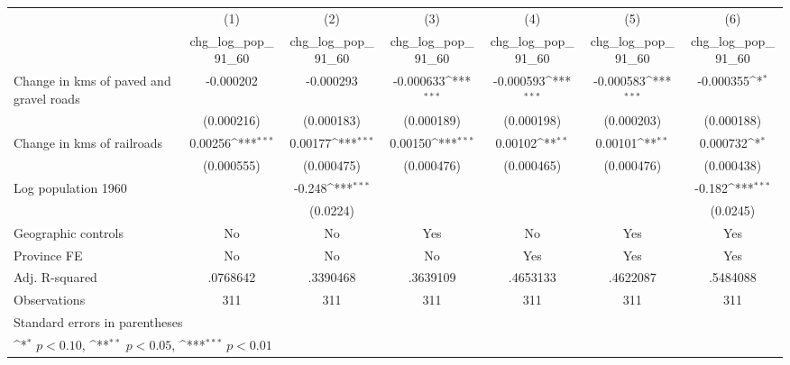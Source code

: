{
\def\sym#1{\ifmmode^{#1}\else\(^{#1}\)\fi}
\begin{tabular}{l*{6}{c}}
\hline\hline
                    &\multicolumn{1}{c}{(1)}&\multicolumn{1}{c}{(2)}&\multicolumn{1}{c}{(3)}&\multicolumn{1}{c}{(4)}&\multicolumn{1}{c}{(5)}&\multicolumn{1}{c}{(6)}\\
                    &\multicolumn{1}{c}{chg\_log\_pop\_91\_60}&\multicolumn{1}{c}{chg\_log\_pop\_91\_60}&\multicolumn{1}{c}{chg\_log\_pop\_91\_60}&\multicolumn{1}{c}{chg\_log\_pop\_91\_60}&\multicolumn{1}{c}{chg\_log\_pop\_91\_60}&\multicolumn{1}{c}{chg\_log\_pop\_91\_60}\\
\hline
Change in kms of paved and gravel roads&   -0.000202         &   -0.000293         &   -0.000633\sym{***}&   -0.000593\sym{***}&   -0.000583\sym{***}&   -0.000355\sym{*}  \\
                    &  (0.000216)         &  (0.000183)         &  (0.000189)         &  (0.000198)         &  (0.000203)         &  (0.000188)         \\
[1em]
Change in kms of railroads&     0.00256\sym{***}&     0.00177\sym{***}&     0.00150\sym{***}&     0.00102\sym{**} &     0.00101\sym{**} &    0.000732\sym{*}  \\
                    &  (0.000555)         &  (0.000475)         &  (0.000476)         &  (0.000465)         &  (0.000476)         &  (0.000438)         \\
[1em]
Log population 1960 &                     &      -0.248\sym{***}&                     &                     &                     &      -0.182\sym{***}\\
                    &                     &    (0.0224)         &                     &                     &                     &    (0.0245)         \\
\hline
Geographic controls &          No         &          No         &         Yes         &          No         &         Yes         &         Yes         \\
Province FE         &          No         &          No         &          No         &         Yes         &         Yes         &         Yes         \\
Adj. R-squared      &    .0768642         &    .3390468         &    .3639109         &    .4653133         &    .4622087         &    .5484088         \\
Observations        &         311         &         311         &         311         &         311         &         311         &         311         \\
\hline\hline
\multicolumn{7}{l}{\footnotesize Standard errors in parentheses}\\
\multicolumn{7}{l}{\footnotesize \sym{*} \(p<0.10\), \sym{**} \(p<0.05\), \sym{***} \(p<0.01\)}\\
\end{tabular}
}
